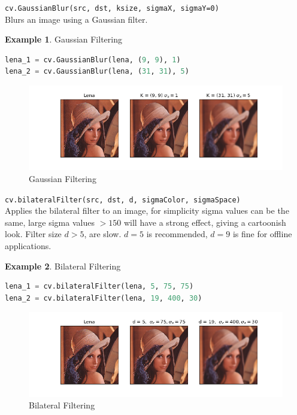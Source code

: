\documentclass{article}
\theoremstyle{definition}
\newtheorem{ex}{Example}[subsection]
\theoremstyle{remark}
\newcommand{\func}[2]{\noindent\lstinline{#1}\\#2}
\begin{document}
\break


\func{cv.GaussianBlur(src, dst, ksize, sigmaX, sigmaY=0)}{Blurs an image using a Gaussian filter.}

\begin{ex} Gaussian Filtering
\begin{lstlisting}[language=Python]
lena_1 = cv.GaussianBlur(lena, (9, 9), 1)
lena_2 = cv.GaussianBlur(lena, (31, 31), 5)
\end{lstlisting}
\begin{figure}[h!]
    \centering
    \includegraphics[width=\textwidth]{ocv_gaussian_filtering}
    \caption{Gaussian Filtering}
    \label{fig:ocv_gauss_filt}
\end{figure}
\end{ex}

\func{cv.bilateralFilter(src, dst, d, sigmaColor, sigmaSpace)}{Applies the bilateral filter to an image, for simplicity sigma values can be the same, large sigma values $ > 150 $ will have a strong effect, giving a cartoonish look. Filter size $ d > 5 $, are slow. $ d = 5 $ is recommended, $ d= 9$ is fine for offline applications.
}

\begin{ex}Bilateral Filtering
\begin{lstlisting}[language=Python]
lena_1 = cv.bilateralFilter(lena, 5, 75, 75)
lena_2 = cv.bilateralFilter(lena, 19, 400, 30)
\end{lstlisting}
\begin{figure}[h!]
    \centering
    \includegraphics[width=\textwidth]{ocv_bilateral_filtering}
    \caption{Bilateral Filtering}
    \label{fig:ocv_bilat_filt}
\end{figure}
\end{ex}
\end{document}
